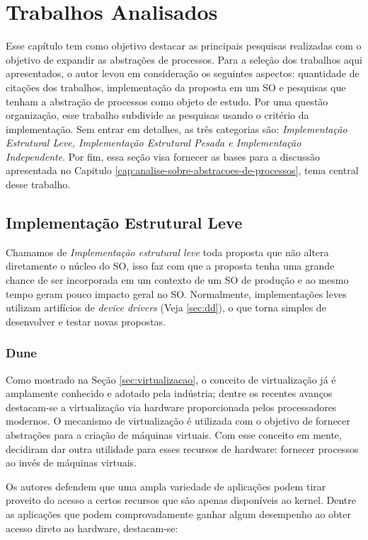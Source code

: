 \chapter{Trabalhos Analisados}
\label{cap:trabalhos-analisados}

Esse capítulo tem como objetivo destacar as principais pesquisas realizadas com
o objetivo de expandir as abstrações de processos. Para a seleção dos trabalhos
aqui apresentados, o autor levou em consideração os seguintes aspectos:
quantidade de citações dos trabalhos, implementação da proposta em um SO e
pesquisas que tenham a abstração de processos como objeto de estudo. Por uma
questão organização, esse trabalho subdivide as pesquisas usando o critério da
implementação. Sem entrar em detalhes, as três categorias são:
\textit{Implementação Estrutural Leve, Implementação Estrutural Pesada e
Implementação Independente}. Por fim, essa seção visa fornecer as bases para a
discussão apresentada no Capitulo
\ref{cap:analise-sobre-abstracoes-de-processos}, tema central desse trabalho.

\section{Implementação Estrutural Leve}

Chamamos de \textit{Implementação estrutural leve} toda proposta que não altera
diretamente o núcleo do SO, isso faz com que a proposta tenha uma grande chance
de ser incorporada em um contexto de um SO de produção e ao mesmo tempo geram
pouco impacto geral no SO. Normalmente, implementações leves utilizam
artifícios de \emph{device drivers} (Veja \ref{sec:dd}), o que torna simples de
desenvolver e testar novas propostas.

\subsection{Dune}

Como mostrado na Seção \ref{sec:virtualizacao}, o conceito de virtualização já
é amplamente conhecido e adotado pela indústria; dentre os recentes avanços
destacam-se a virtualização via hardware proporcionada pelos processadores
modernos. O mecanismo de virtualização é utilizada com o objetivo de fornecer
abstrações para a criação de máquinas virtuais. Com esse conceito em mente,
\cite{belay} decidiram dar outra utilidade para esses recursos de hardware:
fornecer processos ao invés de máquinas virtuais.

Os autores defendem que uma ampla variedade de aplicações podem tirar proveito
do acesso a certos recursos que são apenas disponíveis ao kernel. Dentre as
aplicações que podem comprovadamente ganhar algum desempenho ao obter acesso
direto ao hardware, destacam-se:

